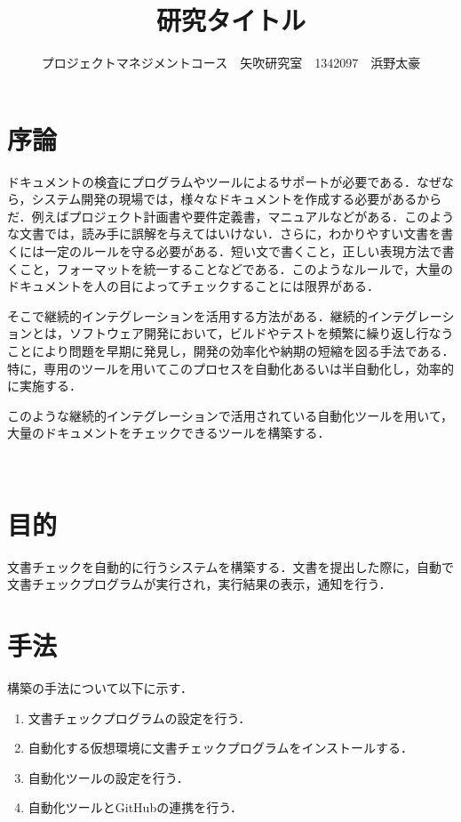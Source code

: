 \documentclass[uplatex,twocolumn,dvipdfmx]{jsarticle}
\title{\vspace{-5mm}\fontsize{14pt}{0pt}\selectfont 研究タイトル}
\author{\normalsize プロジェクトマネジメントコース　矢吹研究室　1342097　浜野太豪}
\date{}
\begin{document}
\fontsize{10.5pt}{\baselineskip}\selectfont
\maketitle





\section{序論}



\noindent

ドキュメントの検査にプログラムやツールによるサポートが必要である．なぜなら，システム開発の現場では，様々なドキュメントを作成する必要があるからだ．例えばプロジェクト計画書や要件定義書，マニュアルなどがある．このような文書では，読み手に誤解を与えてはいけない．さらに，わかりやすい文書を書くには一定のルールを守る必要がある．短い文で書くこと，正しい表現方法で書くこと，フォーマットを統一することなどである．このようなルールで，大量のドキュメントを人の目によってチェックすることには限界がある．

そこで継続的インテグレーションを活用する方法がある．継続的インテグレーションとは，ソフトウェア開発において，ビルドやテストを頻繁に繰り返し行なうことにより問題を早期に発見し，開発の効率化や納期の短縮を図る手法である．特に，専用のツールを用いてこのプロセスを自動化あるいは半自動化し，効率的に実施する\cite{1}．

このような継続的インテグレーションで活用されている自動化ツールを用いて，大量のドキュメントをチェックできるツールを構築する．








　



\noindent


\section{目的}
文書チェックを自動的に行うシステムを構築する．文書を提出した際に，自動で文書チェックプログラムが実行され，実行結果の表示，通知を行う．

\section{手法}
構築の手法について以下に示す．
\begin{enumerate}
\item 文書チェックプログラムの設定を行う．
\item 自動化する仮想環境に文書チェックプログラムをインストールする．
\item 自動化ツールの設定を行う．
\item 自動化ツールとGitHubの連携を行う．

\end{enumerate}
\end{document}
